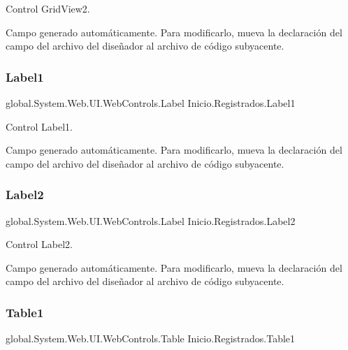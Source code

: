 Control Grid\+View2. 

Campo generado automáticamente. Para modificarlo, mueva la declaración del campo del archivo del diseñador al archivo de código subyacente. \mbox{\label{classInicio_1_1Registrados_a89cbfd8509272c14e26ee466a11b7835}} 
\subsubsection{\texorpdfstring{Label1}{Label1}}
{\footnotesize\ttfamily global.\+System.\+Web.\+U\+I.\+Web\+Controls.\+Label Inicio.\+Registrados.\+Label1\hspace{0.3cm}{\ttfamily [protected]}}



Control Label1. 

Campo generado automáticamente. Para modificarlo, mueva la declaración del campo del archivo del diseñador al archivo de código subyacente. \mbox{\label{classInicio_1_1Registrados_ab7c3cf09be993fe6a07f31881ba27159}} 
\subsubsection{\texorpdfstring{Label2}{Label2}}
{\footnotesize\ttfamily global.\+System.\+Web.\+U\+I.\+Web\+Controls.\+Label Inicio.\+Registrados.\+Label2\hspace{0.3cm}{\ttfamily [protected]}}



Control Label2. 

Campo generado automáticamente. Para modificarlo, mueva la declaración del campo del archivo del diseñador al archivo de código subyacente. \mbox{\label{classInicio_1_1Registrados_a0c8cbd7625175b47e930f927da038acc}} 
\subsubsection{\texorpdfstring{Table1}{Table1}}
{\footnotesize\ttfamily global.\+System.\+Web.\+U\+I.\+Web\+Controls.\+Table Inicio.\+Registrados.\+Table1\hspace{0.3cm}{\ttfamily [protected]}}



